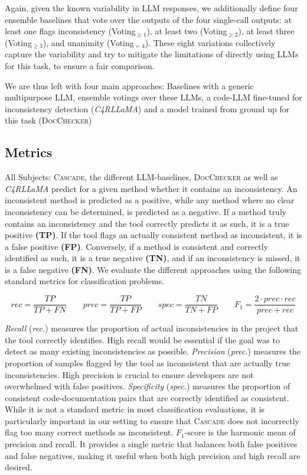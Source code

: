 \documentclass[acmsmall, screen]{acmart}
\newcommand{\tool}{\textsc{Cascade}\xspace}
\begin{document}
Again, given the known variability in LLM responses, we additionally define four ensemble baselines that vote over the outputs of the four single-call outputs: at least one flags inconsistency (Voting$_{\geq1}$), at least two (Voting$_{\geq2}$), at least three (Voting$_{\geq3}$), and unanimity (Voting$_{=4}$).
These eight variations collectively capture the variability and try to mitigate the limitations of directly using LLMs for this task, to ensure a fair comparison.


We are thus left with four main approaches: Baselines with a generic multipurpose LLM, ensemble
votings over these LLMs, a code-LLM fine-tuned for inconsistency detection (\textit{C4RLLaMA}) and a
model trained from ground up for this task (\textsc{DocChecker})


\subsection{Metrics}\label{sec:metrics}
All Subjects: \tool, the different LLM-baselines, \textsc{DocChecker} as well as \textit{C4RLLaMA} predict for a given method whether it contains an inconsistency. An inconsistent method is predicted as a positive, while any method where no clear inconsistency can be determined, is predicted as a negative.
If a method truly contains an inconsistency and the tool correctly predicts it as such, it is a true positive \textbf{(TP)}. If the tool flags an actually consistent method as inconsistent, it is a false positive \textbf{(FP)}. Conversely, if a method is consistent and correctly identified as such, it is a true negative \textbf{(TN)}, and if an inconsistency is missed, it is a false negative \textbf{(FN)}.
We evaluate the different approaches using the following standard metrics for classification problems.

\begin{equation*}
    rec = \frac{TP}{TP + FN} \quad\quad  prec = \frac{TP}{TP + FP} \quad\quad spec = \frac{TN}{TN + FP} \quad \quad F_1=\frac{2\cdot prec \cdot rec}{prec + rec}
\end{equation*}

\textit{Recall} (\textit{rec.}) measures the proportion of actual inconsistencies in the project that the tool correctly identifies. High recall would be essential if the goal was to detect as many existing inconsistencies as possible. 
\textit{Precision} (\textit{prec.}) measures the proportion of samples flagged by the tool as inconsistent that are actually true inconsistencies. High precision is crucial to ensure developers are not overwhelmed with false positives.
\textit{Specificity} (\textit{spec.}) measures the proportion of consistent code-documentation pairs that are correctly identified as consistent. While it is not a standard metric in most classification evaluations, it is particularly important in our setting to ensure that \tool does not incorrectly flag too many correct methods as inconsistent.
$F_1$-score is the harmonic mean of precision and recall. It provides a single metric that balances both false positives and false negatives, making it useful when both high precision and high recall are desired.
\end{document}
